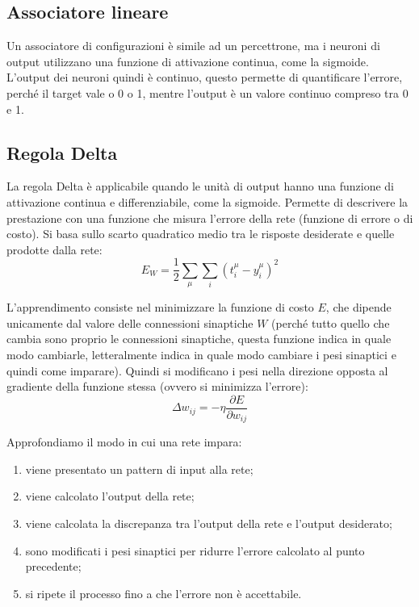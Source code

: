 \subsection{Associatore lineare}

Un associatore di configurazioni è simile ad un percettrone, ma i neuroni di
output utilizzano una funzione di attivazione continua, come la sigmoide.
L'output dei neuroni quindi è continuo, questo permette di quantificare
l'errore, perché il target vale o 0 o 1, mentre l'output è un valore continuo
compreso tra 0 e 1.

\subsection{Regola Delta}

La regola Delta è applicabile quando le unità di output hanno una funzione di
attivazione continua e differenziabile, come la sigmoide. Permette di descrivere
la prestazione con una funzione che misura l'errore della rete (funzione di
errore o di costo). Si basa sullo scarto quadratico medio tra le risposte
desiderate e quelle prodotte dalla rete:
\begin{equation*}
	E_W = \frac{1}{2} \sum_{\mu} \sum_{i} (t_i^\mu - y_i^\mu)^2
\end{equation*}

L'apprendimento consiste nel minimizzare la funzione di costo $E$, che dipende
unicamente dal valore delle connessioni sinaptiche $W$ (perché tutto quello che
cambia sono proprio le connessioni sinaptiche, questa funzione indica in quale
modo cambiarle, letteralmente indica in quale modo cambiare i pesi sinaptici e
quindi come imparare). Quindi si modificano i pesi nella direzione opposta al
gradiente della funzione stessa (ovvero si minimizza l'errore):
\begin{equation*}
	\Delta w_{ij} = - \eta \frac{\partial E}{\partial w_{ij}}
\end{equation*}

Approfondiamo il modo in cui una rete impara:
\begin{enumerate}
	\item viene presentato un pattern di input alla rete;
	\item viene calcolato l'output della rete;
	\item viene calcolata la discrepanza tra l'output della rete e l'output
		desiderato;
	\item sono modificati i pesi sinaptici per ridurre l'errore calcolato al 
		punto precedente;
	\item si ripete il processo fino a che l'errore non è accettabile.
\end{enumerate}

